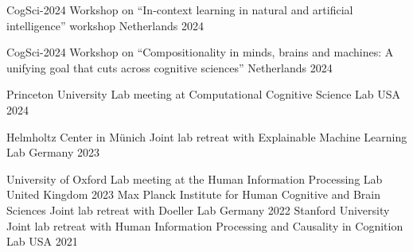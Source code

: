 



\begin{cvhonors}


    \cvhonor
    {CogSci-2024} %
    {Workshop on “In‑context learning in natural and artificial intelligence” workshop} 
    {Netherlands} %
    {2024} %

    \cvhonor
    {CogSci-2024} %
    {Workshop on “Compositionality in minds, brains and machines: A unifying goal that cuts across cognitive sciences”} 
    {Netherlands} %
    {2024} %

    
    \cvhonor
    {Princeton University} %
    {Lab meeting at Computational Cognitive Science Lab} 
    {USA} %
    {2024} %

  

    \cvhonor
    {Helmholtz Center in Münich} %
    {Joint lab retreat with Explainable Machine Learning Lab} 
    {Germany} %
    {2023} %
    
    \cvhonor
    {University of Oxford} %
    {Lab meeting at the Human Information Processing Lab} %
    {United Kingdom} %
    {2023} %
    \cvhonor
    {Max Planck Institute for Human Cognitive and Brain Sciences} %
    {Joint lab retreat with Doeller Lab} %
    {Germany} %
    {2022} %
    \cvhonor
    {Stanford University} %
    {Joint lab retreat with Human Information Processing and Causality in Cognition Lab} %
    {USA} %
    {2021} %
\\
\end{cvhonors}


